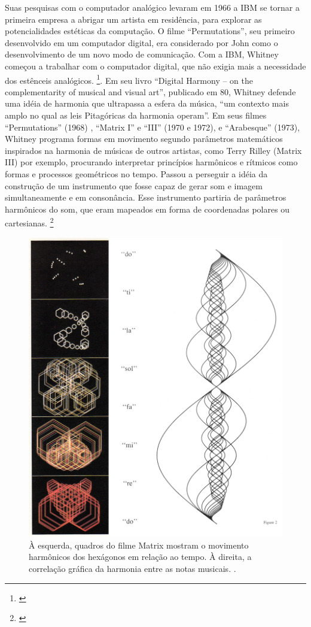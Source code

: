 Suas pesquisas com o computador analógico levaram em 1966 a IBM se tornar a primeira empresa a abrigar um artista em residência, para explorar as potencialidades estéticas da computação. O filme ``Permutations'', seu primeiro desenvolvido em um computador digital, era considerado por John como o desenvolvimento de um novo modo de comunicação. Com a IBM, Whitney começou a trabalhar com o computador digital, que não exigia mais a necessidade dos estênceis analógicos. \footnote{\cite{Youngblood1970}}. 
Em seu livro ``Digital Harmony – on the complementarity of musical and visual art'', publicado em 80, Whitney defende uma idéia de harmonia que ultrapassa a esfera da música, ``um contexto mais amplo no qual as leis Pitagóricas da harmonia operam''. Em seus filmes ``Permutations'' (1968) , ``Matrix I'' e ``III'' (1970 e 1972), e ``Arabesque'' (1973), Whitney programa formas em movimento segundo parâmetros matemáticos inspirados na harmonia de músicas de outros artistas, como Terry Rilley (Matrix III) por exemplo, procurando interpretar princípios harmônicos e rítmicos como formas e processos geométricos no tempo. Passou a perseguir a idéia da construção de um instrumento que fosse capaz de gerar som e imagem simultaneamente e em consonância. Esse instrumento partiria de parâmetros harmônicos do som, que eram mapeados em forma de coordenadas polares ou cartesianas. \footnote{\cite{Whitney1980}}

\begin{figure}
    \caption{\label{matrix}À esquerda, quadros do filme Matrix mostram o movimento harmônicos dos hexágonos em relação ao tempo. À direita, a correlação gráfica da harmonia entre as notas musicais.
.}
    
        \includegraphics[width=0.8\linewidth]{pictures/cap2/witney2}
    
\end{figure}


